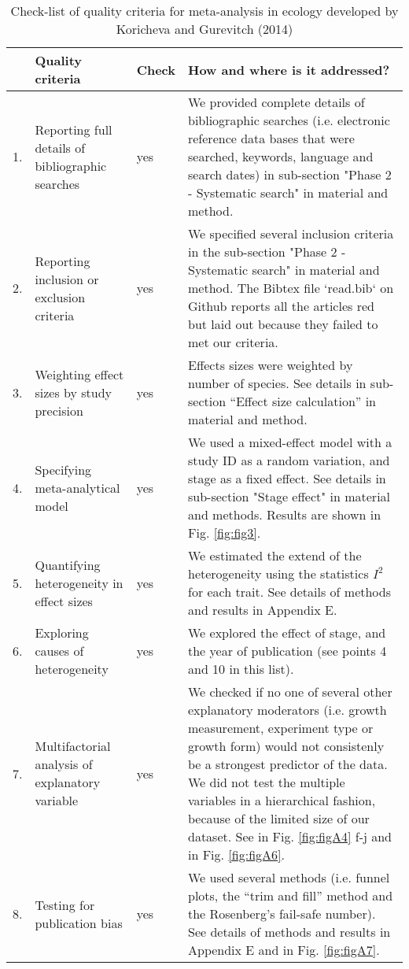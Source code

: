 \documentclass[a4paper,11pt]{article}
\begin{document}
\clearpage
\begin{table}[h!]
\centering
\caption{Check-list of quality criteria for meta-analysis in ecology developed by Koricheva and Gurevitch (2014) }
{\footnotesize
\vspace{0.5cm}
\begin{tabular}{p{0.2cm}p{4cm}p{0.8cm}p{7cm}}
  \hline
  & Quality criteria & Check & How and where is it addressed? \\
  \hline
  1.& Reporting full details of bibliographic searches & yes	& We provided complete details of bibliographic searches (i.e. electronic reference data bases that were searched, keywords, language and search dates) in sub-section "Phase 2 - Systematic search" in material and method.\\
  2.& Reporting inclusion or exclusion criteria & yes & We specified several inclusion criteria in the sub-section "Phase 2 - Systematic search" in material and method. The Bibtex file `read.bib` on Github reports all the articles red but laid out because they failed to met our criteria.\\
  3.& Weighting effect sizes by study precision & yes & Effects sizes were weighted by number of species. See	 details in sub-section ``Effect size calculation'' in material and method.\\
 4.& Specifying meta-analytical model &	yes	& We used a mixed-effect model with a study ID as a random variation, and stage as a fixed effect. See details in sub-section "Stage effect" in material and methods. Results are shown in Fig. \ref{fig:fig3}.\\
 5.& Quantifying heterogeneity in effect sizes &	yes &	We estimated the extend of the heterogeneity using the statistics $I^{2}$ for each trait. See details of methods and results in Appendix E.\\
 6.& Exploring causes of heterogeneity & yes &	We explored the effect of stage, and the year of publication (see points 4 and 10 in this list). \\
 7.& Multifactorial analysis of explanatory variable	& yes & We checked if no one of several other explanatory moderators (i.e. growth measurement, experiment type or growth form) would not consistenly be a strongest predictor of the data. We did not test the multiple variables in a hierarchical fashion, because of the limited size of our dataset. See in Fig. \ref{fig:figA4} f-j and in Fig. \ref{fig:figA6}.\\
  8.& Testing for publication bias &	yes	& We used several methods (i.e. funnel plots, the ``trim and fill'' method and the Rosenberg’s fail-safe number). See details of methods and results in Appendix E and in Fig. \ref{fig:figA7}.\\

\end{tabular}}
\end{table}
\end{document}
